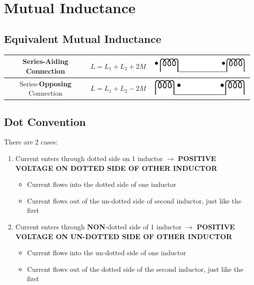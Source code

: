 \documentclass[10pt,letterpaper,final,twoside,notitlepage]{article}
\begin{document}
\section*{Mutual Inductance} \label{sec:Mutual Inductance}
	\subsection*{Equivalent Mutual Inductance}
		\begin{table}[h!] %
			\centering
			\renewcommand{\arraystretch}{2.25}
			\begin{tabular}{|c|c|c|}
			\hline
			Series-\textbf{Aiding} Connection & $L=L_{1}+L_{2}+2M$ & \includegraphics[scale=0.35]{Mutual_Inductors_Series_Dots_Aiding.png} \\ \hline
			Series-\textbf{Opposing} Connection & $L=L_{1}+L_{2}-2M$ & \includegraphics[scale=0.35]{Mutual_Inductors_Series_Dots_Opposing.png} \\ \hline
			\end{tabular}
		\end{table}

	\subsection*{Dot Convention} \label{subsec:Dot Convention}
		There are 2 cases:
		\begin{enumerate}
			\item Current enters through dotted side on 1 inductor $\longrightarrow$ \textbf{POSITIVE VOLTAGE ON DOTTED SIDE OF OTHER INDUCTOR}
				\begin{itemize}[noitemsep, nolistsep]
					\item Current flows into the dotted side of one inductor
					\item Current flows out of the un-dotted side of second inductor, just like the first
				\end{itemize}
			\item Current enters through \textbf{NON}-dotted side of 1 inductor $\longrightarrow$ \textbf{POSITIVE VOLTAGE ON UN-DOTTED SIDE OF OTHER INDUCTOR}
				\begin{itemize}[noitemsep, nolistsep]
					\item Current flows into the un-dotted side of one inductor
					\item Current flows out of the dotted side of the second inductor, just like the first
				\end{itemize}
		\end{enumerate}
	
\end{document}
